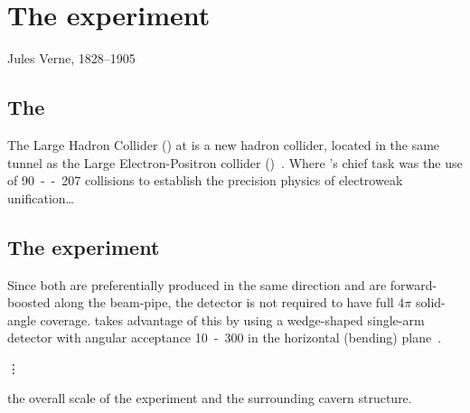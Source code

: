 \chapter{The \LHCb experiment}
\label{chap:MoreStuff}

{Jules Verne, 1828--1905}

\section{The \LHC}
The Large Hadron Collider (\LHC) at \CERN is a new hadron collider,
located in the same tunnel as the Large Electron-Positron collider
(\LEP)~\cite{Brianti:2004qq}. Where \LEP's chief task was the use
of \unit{90--207}{\GeV} \epluseminus collisions to establish the
precision physics of electroweak unification\dots


\section{The \LHCb experiment}
\label{sec:LHCbInDetail}

Since both  are preferentially produced in the same direction
and are forward-boosted along the beam-pipe, the detector is not required
to have full $4\pi$ solid-angle coverage. \LHCb takes advantage of this
by using a wedge-shaped single-arm detector with angular acceptance
\unit{10-300}{\mrad} in the horizontal (bending) plane~\cite{Amato:1998xt}.

\vspace{1cm}

\begin{center}
{\hspace{1mm}\Large\vdots\hspace{1cm}}
\end{center}

\vspace{1cm}

the overall scale of the experiment and the surrounding cavern structure.

